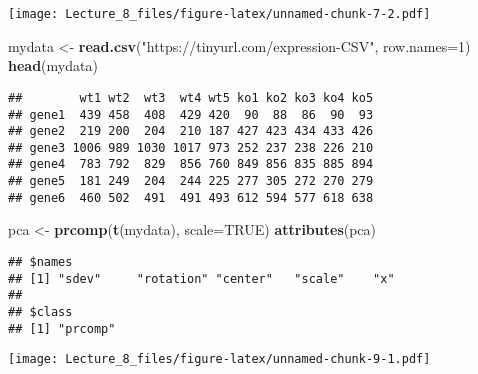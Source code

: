 \documentclass[]{article}
\newenvironment{Shaded}{\begin{snugshade}}{\end{snugshade}}
\newcommand{\DataTypeTok}[1]{\textcolor[rgb]{0.13,0.29,0.53}{#1}}
\newcommand{\DecValTok}[1]{\textcolor[rgb]{0.00,0.00,0.81}{#1}}
\newcommand{\KeywordTok}[1]{\textcolor[rgb]{0.13,0.29,0.53}{\textbf{#1}}}
\newcommand{\NormalTok}[1]{#1}
\newcommand{\OperatorTok}[1]{\textcolor[rgb]{0.81,0.36,0.00}{\textbf{#1}}}
\newcommand{\OtherTok}[1]{\textcolor[rgb]{0.56,0.35,0.01}{#1}}
\newcommand{\StringTok}[1]{\textcolor[rgb]{0.31,0.60,0.02}{#1}}
\begin{document}
\texttt{[image: Lecture\_8\_files/figure-latex/unnamed-chunk-7-2.pdf]}

\begin{Shaded}
\begin{Highlighting}[]
\NormalTok{mydata <-}\StringTok{ }\KeywordTok{read.csv}\NormalTok{(}\StringTok{"https://tinyurl.com/expression-CSV"}\NormalTok{, }\DataTypeTok{row.names=}\DecValTok{1}\NormalTok{)}
\KeywordTok{head}\NormalTok{(mydata)}
\end{Highlighting}
\end{Shaded}

\begin{verbatim}
##        wt1 wt2  wt3  wt4 wt5 ko1 ko2 ko3 ko4 ko5
## gene1  439 458  408  429 420  90  88  86  90  93
## gene2  219 200  204  210 187 427 423 434 433 426
## gene3 1006 989 1030 1017 973 252 237 238 226 210
## gene4  783 792  829  856 760 849 856 835 885 894
## gene5  181 249  204  244 225 277 305 272 270 279
## gene6  460 502  491  491 493 612 594 577 618 638
\end{verbatim}

\begin{Shaded}
\begin{Highlighting}[]
\NormalTok{pca <-}\StringTok{ }\KeywordTok{prcomp}\NormalTok{(}\KeywordTok{t}\NormalTok{(mydata), }\DataTypeTok{scale=}\OtherTok{TRUE}\NormalTok{)}
\KeywordTok{attributes}\NormalTok{(pca)}
\end{Highlighting}
\end{Shaded}

\begin{verbatim}
## $names
## [1] "sdev"     "rotation" "center"   "scale"    "x"       
## 
## $class
## [1] "prcomp"
\end{verbatim}

\begin{Shaded}
\end{Shaded}

\texttt{[image: Lecture\_8\_files/figure-latex/unnamed-chunk-9-1.pdf]}

\begin{Shaded}
\end{Shaded}
\end{document}
